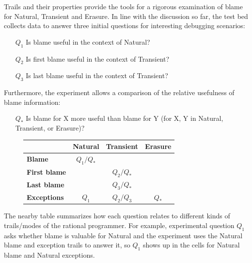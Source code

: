 
Trails and their properties provide the tools for a rigorous examination of
blame for Natural, Transient and Erasure. In line with the discussion so far,
the test bed collects data to answer three initial questions for 
interesting debugging scenarios:
\begin{itemize}
\item[$Q_1$] Is blame useful in the context of Natural?

\item[$Q_2$] Is first blame useful in the context of Transient?

\item[$Q_3$] Is last blame useful in the context of Transient?

\end{itemize}

Furthermore, the experiment allows a comparison of the relative usefulness of blame
information:
\begin{itemize}
\item[$Q_*$] Is blame for X more useful than blame for Y (for X, Y in Natural, Transient, or Erasure)?
\end{itemize}

\begin{figure}
\footnotesize
\center
{\begin{tabular}{l|c|c|c}
                        & {\bf Natural}  & {\bf Transient} &  {\bf Erasure} \\ \hline 
{\bf Blame}             &  $Q_1/Q_*$    &                  &                \\
{\bf First blame}       &               &     $Q_2/Q_*$    &                 \\
{\bf Last blame}        &               &     $Q_3/Q_*$    &                 \\
{\bf Exceptions}        &      $Q_1$    &     $Q_2/Q_3$    &      $Q_*$      \\
\end{tabular}}
  \label{fig:experiment-outline}
\end{figure}

The nearby table summarizes how each question relates to
different kinds of trails/modes of the rational programmer. For example,
experimental question $Q_1$ asks whether blame is valuable for Natural and the
experiment uses the Natural blame and exception trails to answer it, so $Q_1$
shows up in the cells for Natural blame and Natural exceptions.

